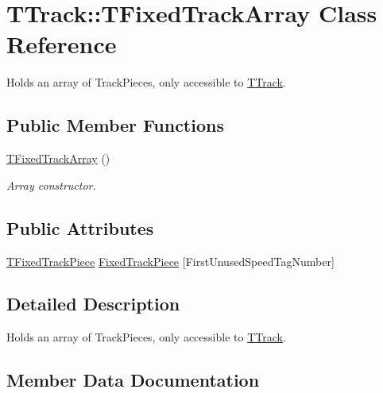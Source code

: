 \hypertarget{class_t_track_1_1_t_fixed_track_array}{}\section{T\+Track\+:\+:T\+Fixed\+Track\+Array Class Reference}
\label{class_t_track_1_1_t_fixed_track_array}


Holds an array of Track\+Pieces, only accessible to \mbox{\hyperlink{class_t_track}{T\+Track}}.  


\subsection*{Public Member Functions}
\begin{DoxyCompactItemize}
\item 
\mbox{\label{class_t_track_1_1_t_fixed_track_array_a0fd7c1a4d4b9f09704a39c40bd202462}} 
\mbox{\hyperlink{class_t_track_1_1_t_fixed_track_array_a0fd7c1a4d4b9f09704a39c40bd202462}{T\+Fixed\+Track\+Array}} ()
\begin{DoxyCompactList}\small\item\em Array constructor. \end{DoxyCompactList}\end{DoxyCompactItemize}
\subsection*{Public Attributes}
\begin{DoxyCompactItemize}
\item 
\mbox{\hyperlink{class_t_fixed_track_piece}{T\+Fixed\+Track\+Piece}} \mbox{\hyperlink{class_t_track_1_1_t_fixed_track_array_a32c84d732dc1990a3ba33f10a4602c8a}{Fixed\+Track\+Piece}} \mbox{[}First\+Unused\+Speed\+Tag\+Number\mbox{]}
\end{DoxyCompactItemize}


\subsection{Detailed Description}
Holds an array of Track\+Pieces, only accessible to \mbox{\hyperlink{class_t_track}{T\+Track}}. 

\subsection{Member Data Documentation}
\mbox{\label{class_t_track_1_1_t_fixed_track_array_a32c84d732dc1990a3ba33f10a4602c8a}} 
